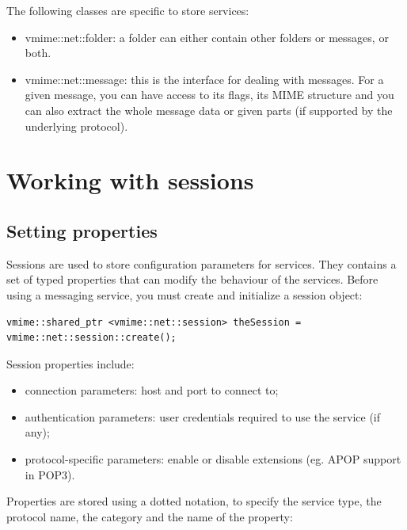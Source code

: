 The following classes are specific to store services:

\begin{itemize}
\item {\vcode vmime::net::folder}: a folder can either contain other folders
or messages, or both.

\item {\vcode vmime::net::message}: this is the interface for dealing with
messages. For a given message, you can have access to its flags, its MIME
structure and you can also extract the whole message data or given parts (if
supported by the underlying protocol).
\end{itemize}


\section{Working with sessions}

\subsection{Setting properties} %

Sessions are used to store configuration parameters for services. They
contains a set of typed properties that can modify the behaviour of the
services. Before using a messaging service, you must create and
initialize a session object:

\begin{lstlisting}
vmime::shared_ptr <vmime::net::session> theSession = vmime::net::session::create();
\end{lstlisting}

Session properties include:

\begin{itemize}
\item connection parameters: host and port to connect to;
\item authentication parameters: user credentials required to use the
service (if any);
\item protocol-specific parameters: enable or disable extensions (eg. APOP
support in POP3).
\end{itemize}

Properties are stored using a dotted notation, to specify the service type,
the protocol name, the category and the name of the property:

